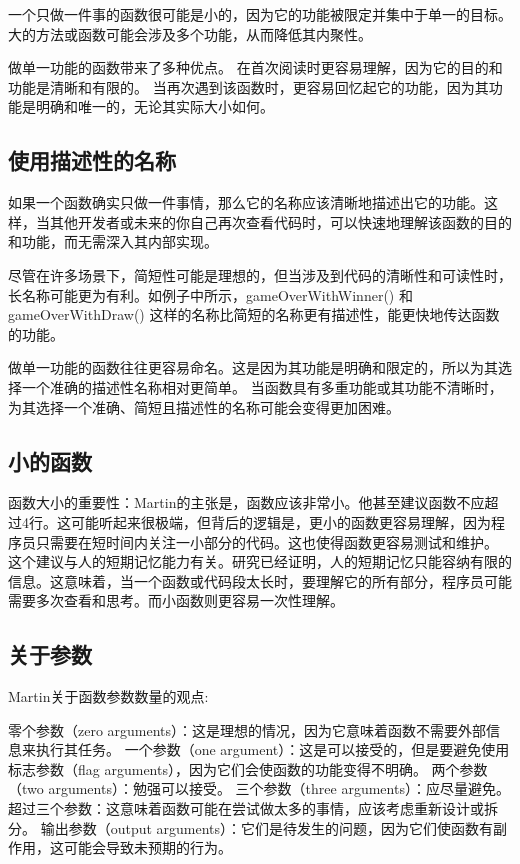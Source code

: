 \documentclass[]{ctexbook}
\begin{document}
一个只做一件事的函数很可能是小的，因为它的功能被限定并集中于单一的目标。
大的方法或函数可能会涉及多个功能，从而降低其内聚性。

做单一功能的函数带来了多种优点。
在首次阅读时更容易理解，因为它的目的和功能是清晰和有限的。
当再次遇到该函数时，更容易回忆起它的功能，因为其功能是明确和唯一的，无论其实际大小如何。

\subsection{使用描述性的名称}
如果一个函数确实只做一件事情，那么它的名称应该清晰地描述出它的功能。这样，当其他开发者或未来的你自己再次查看代码时，可以快速地理解该函数的目的和功能，而无需深入其内部实现。

尽管在许多场景下，简短性可能是理想的，但当涉及到代码的清晰性和可读性时，长名称可能更为有利。如例子中所示，gameOverWithWinner() 和 gameOverWithDraw() 这样的名称比简短的名称更有描述性，能更快地传达函数的功能。

做单一功能的函数往往更容易命名。这是因为其功能是明确和限定的，所以为其选择一个准确的描述性名称相对更简单。
当函数具有多重功能或其功能不清晰时，为其选择一个准确、简短且描述性的名称可能会变得更加困难。




\subsection{小的函数}

函数大小的重要性：Martin的主张是，函数应该非常小。他甚至建议函数不应超过4行。这可能听起来很极端，但背后的逻辑是，更小的函数更容易理解，因为程序员只需要在短时间内关注一小部分的代码。这也使得函数更容易测试和维护。
这个建议与人的短期记忆能力有关。研究已经证明，人的短期记忆只能容纳有限的信息。这意味着，当一个函数或代码段太长时，要理解它的所有部分，程序员可能需要多次查看和思考。而小函数则更容易一次性理解。



\subsection{关于参数}
Martin关于函数参数数量的观点:

零个参数（zero arguments）：这是理想的情况，因为它意味着函数不需要外部信息来执行其任务。
一个参数（one argument）：这是可以接受的，但是要避免使用标志参数（flag arguments），因为它们会使函数的功能变得不明确。
两个参数（two arguments）：勉强可以接受。
三个参数（three arguments）：应尽量避免。
超过三个参数：这意味着函数可能在尝试做太多的事情，应该考虑重新设计或拆分。
输出参数（output arguments）：它们是待发生的问题，因为它们使函数有副作用，这可能会导致未预期的行为。
\end{document}
